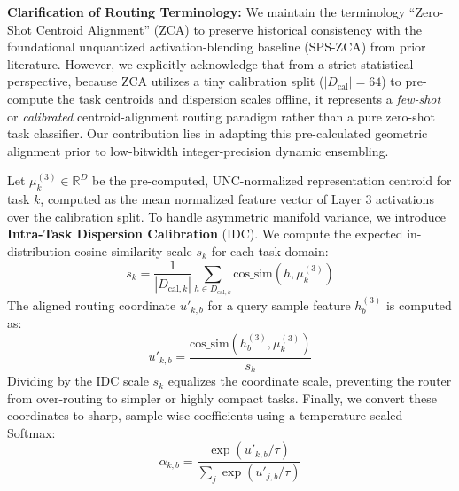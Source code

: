 \textbf{Clarification of Routing Terminology:} We maintain the terminology ``Zero-Shot Centroid Alignment'' (ZCA) to preserve historical consistency with the foundational unquantized activation-blending baseline (SPS-ZCA) from prior literature. However, we explicitly acknowledge that from a strict statistical perspective, because ZCA utilizes a tiny calibration split ($|D_{\text{cal}}| = 64$) to pre-compute the task centroids and dispersion scales offline, it represents a \emph{few-shot} or \emph{calibrated} centroid-alignment routing paradigm rather than a pure zero-shot task classifier. Our contribution lies in adapting this pre-calculated geometric alignment prior to low-bitwidth integer-precision dynamic ensembling.

Let $\mu^{(3)}_k \in \mathbb{R}^D$ be the pre-computed, UNC-normalized representation centroid for task $k$, computed as the mean normalized feature vector of Layer 3 activations over the calibration split. To handle asymmetric manifold variance, we introduce \textbf{Intra-Task Dispersion Calibration} (IDC). We compute the expected in-distribution cosine similarity scale $s_k$ for each task domain:
\begin{equation}
  s_k = \frac{1}{|D_{\text{cal}, k}|} \sum_{h \in D_{\text{cal}, k}} \text{cos\_sim}(h, \mu^{(3)}_k)
\end{equation}
The aligned routing coordinate $u'_{k, b}$ for a query sample feature $h_b^{(3)}$ is computed as:
\begin{equation}
  u'_{k, b} = \frac{\text{cos\_sim}(h_b^{(3)}, \mu^{(3)}_k)}{s_k}
\end{equation}
Dividing by the IDC scale $s_k$ equalizes the coordinate scale, preventing the router from over-routing to simpler or highly compact tasks. Finally, we convert these coordinates to sharp, sample-wise coefficients using a temperature-scaled Softmax:
\begin{equation}
  \alpha_{k, b} = \frac{\exp(u'_{k, b} / \tau)}{\sum_j \exp(u'_{j, b} / \tau)}
\end{equation}
